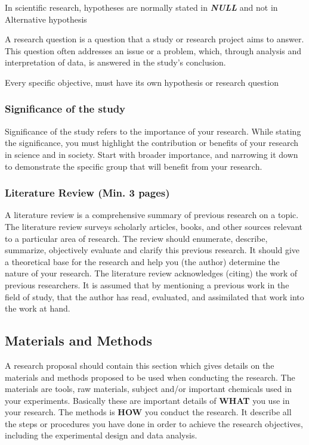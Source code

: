 \documentclass[
  12pt,
  a4paper,
  DIV=11,
  numbers=noendperiod]{scrartcl}
\begin{document}
In scientific research, hypotheses are normally stated in
\textbf{\emph{NULL}} and not in Alternative hypothesis

A research question is a question that a study or research project aims
to answer. This question often addresses an issue or a problem, which,
through analysis and interpretation of data, is answered in the study's
conclusion.

Every specific objective, must have its own hypothesis or research
question

\hypertarget{significance-of-the-study}{%
\subsubsection{Significance of the
study}\label{significance-of-the-study}}

Significance of the study refers to the importance of your research.
While stating the significance, you must highlight the contribution or
benefits of your research in science and in society. Start with broader
importance, and narrowing it down to demonstrate the specific group that
will benefit from your research.

\hypertarget{literature-review-min.-3-pages}{%
\subsubsection{Literature Review (Min. 3
pages)}\label{literature-review-min.-3-pages}}

A literature review is a comprehensive summary of previous research on a
topic. The literature review surveys scholarly articles, books, and
other sources relevant to a particular area of research. The review
should enumerate, describe, summarize, objectively evaluate and clarify
this previous research. It should give a theoretical base for the
research and help you (the author) determine the nature of your
research. The literature review acknowledges (citing) the work of
previous researchers. It is assumed that by mentioning a previous work
in the field of study, that the author has read, evaluated, and
assimilated that work into the work at hand.

\hypertarget{materials-and-methods}{%
\subsection{Materials and Methods}\label{materials-and-methods}}

A research proposal should contain this section which gives details on
the materials and methods proposed to be used when conducting the
research. The materials are tools, raw materials, subject and/or
important chemicals used in your experiments. Basically these are
important details of \textbf{WHAT} you use in your research. The methods
is \textbf{HOW} you conduct the research. It describe all the steps or
procedures you have done in order to achieve the research objectives,
including the experimental design and data analysis.
\end{document}
